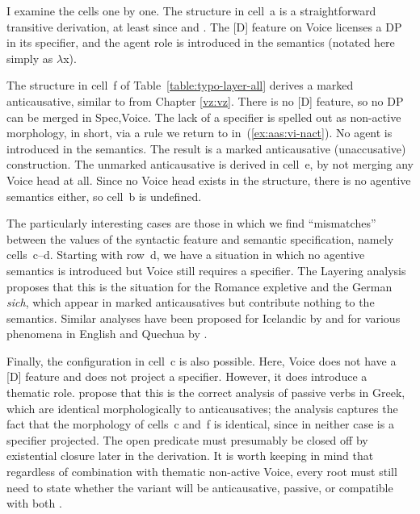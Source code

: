 \begin{exe}
\begin{xlist}
\begin{exe}
\begin{exe}
\begin{xlist}
\begin{exe}
I examine the cells one by one. The structure in cell~a is a straightforward transitive derivation, at least since \cite{kratzer96} and \citep{pylkkanen08}. The [D] feature on Voice licenses a DP in its specifier, and the agent role is introduced in the semantics (notated here simply as $\lambda$x).

The structure in cell~f of Table~\ref{table:typo-layer-all} derives a marked anticausative, similar to {\tnif} from Chapter \ref{vz:vz}. There is no [D] feature, so no DP can be merged in Spec,Voice. The lack of a specifier is spelled out as non-active morphology,  in short, via a rule we return to in~(\ref{ex:aas:vi-nact}). No agent is introduced in the semantics. The result is a marked anticausative (unaccusative) construction. The unmarked anticausative is derived in cell~e, by not merging any Voice head at all. Since no Voice head exists in the structure, there is no agentive semantics either, so cell~b is undefined.

The particularly interesting cases are those in which we find ``mismatches'' between the values of the syntactic feature and semantic specification, namely cells~c--d. Starting with row~d, we have a situation in which no agentive semantics is introduced but Voice still requires a specifier. The Layering analysis proposes that this is the situation for the Romance expletive  and the German \emph{sich}, which appear in marked anticausatives but contribute nothing to the semantics. Similar analyses have been proposed for Icelandic by \cite{wood14nllt,wood15springer} and for various phenomena in English and Quechua by \cite{myler16mit}.

Finally, the configuration in cell~c is also possible. Here, Voice does not have a [D] feature and does not project a specifier. However, it does introduce a thematic role. \cite{layering15} propose that this is the correct analysis of passive verbs in Greek, which are identical morphologically to anticausatives; the analysis captures the fact that the morphology of cells~c and~f is identical, since in neither case is a specifier projected. The open predicate must presumably be closed off by existential closure later in the derivation. It is worth keeping in mind that regardless of combination with thematic non-active Voice, every root must still need to state whether the  variant will be anticausative, passive, or compatible with both \citep[88]{alexiadouanagnostopoulou04,layering15}.



\end{exe}
\end{xlist}
\end{exe}
\end{exe}
\end{xlist}
\end{exe}
